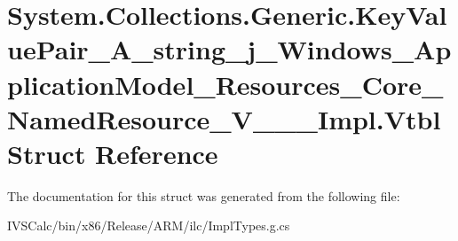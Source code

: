 \hypertarget{struct_system_1_1_collections_1_1_generic_1_1_key_value_pair___a__string__j___windows___applicate7efd9254a1d07ff46cd24d852285034}{}\section{System.\+Collections.\+Generic.\+Key\+Value\+Pair\+\_\+\+A\+\_\+string\+\_\+j\+\_\+\+Windows\+\_\+\+Application\+Model\+\_\+\+Resources\+\_\+\+Core\+\_\+\+Named\+Resource\+\_\+\+V\+\_\+\+\_\+\+\_\+\+Impl.\+Vtbl Struct Reference}
\label{struct_system_1_1_collections_1_1_generic_1_1_key_value_pair___a__string__j___windows___applicate7efd9254a1d07ff46cd24d852285034}


The documentation for this struct was generated from the following file\+:\begin{DoxyCompactItemize}
\item 
I\+V\+S\+Calc/bin/x86/\+Release/\+A\+R\+M/ilc/Impl\+Types.\+g.\+cs\end{DoxyCompactItemize}

